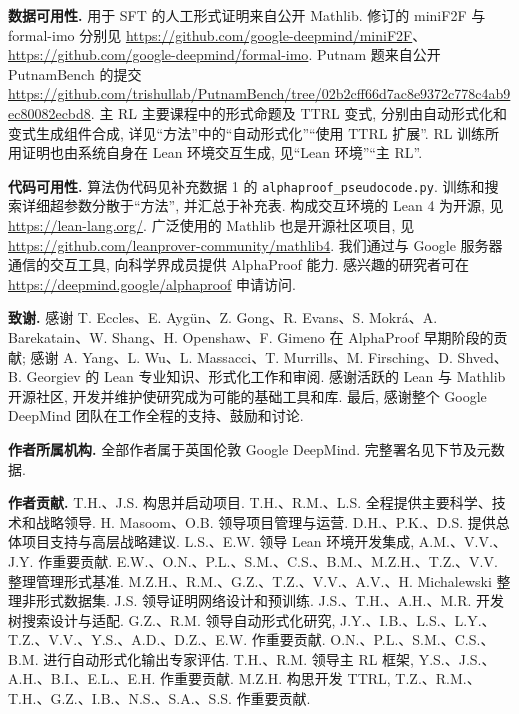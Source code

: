 \label{alphaproof-availability}
\noindent\textbf{数据可用性.} 用于 SFT 的人工形式证明来自公开 Mathlib\cite{alphaproof-ref4}. 修订的 miniF2F 与 formal-imo 分别见 \url{https://github.com/google-deepmind/miniF2F}、\url{https://github.com/google-deepmind/formal-imo}. Putnam 题来自公开 PutnamBench\cite{alphaproof-ref21} 的提交 \url{https://github.com/trishullab/PutnamBench/tree/02b2cff66d7ac8e9372c778c4ab9ec80082ecbd8}. 主 RL 主要课程中的形式命题及 TTRL 变式, 分别由自动形式化和变式生成组件合成, 详见“方法”中的“自动形式化”“使用 TTRL 扩展”. RL 训练所用证明也由系统自身在 Lean 环境交互生成, 见“Lean 环境”“主 RL”.

\noindent\textbf{代码可用性.} 算法伪代码见补充数据 1 的 \texttt{alphaproof\_pseudocode.py}. 训练和搜索详细超参数分散于“方法”, 并汇总于补充表. 构成交互环境的 Lean 4 为开源, 见 \url{https://lean-lang.org/}. 广泛使用的 Mathlib 也是开源社区项目, 见 \url{https://github.com/leanprover-community/mathlib4}. 我们通过与 Google 服务器通信的交互工具, 向科学界成员提供 AlphaProof 能力. 感兴趣的研究者可在 \url{https://deepmind.google/alphaproof} 申请访问.

\label{alphaproof-backmatter}
\noindent\textbf{致谢.} 感谢 T. Eccles、E. Aygün、Z. Gong、R. Evans、S. Mokrá、A. Barekatain、W. Shang、H. Openshaw、F. Gimeno 在 AlphaProof 早期阶段的贡献; 感谢 A. Yang、L. Wu、L. Massacci、T. Murrills、M. Firsching、D. Shved、B. Georgiev 的 Lean 专业知识、形式化工作和审阅. 感谢活跃的 Lean 与 Mathlib 开源社区, 开发并维护使研究成为可能的基础工具和库. 最后, 感谢整个 Google DeepMind 团队在工作全程的支持、鼓励和讨论.

\noindent\textbf{作者所属机构.} 全部作者属于英国伦敦 Google DeepMind. 完整署名见下节及元数据.

\noindent\textbf{作者贡献.} T.H.、J.S. 构思并启动项目. T.H.、R.M.、L.S. 全程提供主要科学、技术和战略领导. H. Masoom、O.B. 领导项目管理与运营. D.H.、P.K.、D.S. 提供总体项目支持与高层战略建议. L.S.、E.W. 领导 Lean 环境开发集成, A.M.、V.V.、J.Y. 作重要贡献. E.W.、O.N.、P.L.、S.M.、C.S.、B.M.、M.Z.H.、T.Z.、V.V. 整理管理形式基准. M.Z.H.、R.M.、G.Z.、T.Z.、V.V.、A.V.、H. Michalewski 整理非形式数据集. J.S. 领导证明网络设计和预训练. J.S.、T.H.、A.H.、M.R. 开发树搜索设计与适配. G.Z.、R.M. 领导自动形式化研究, J.Y.、I.B.、L.S.、L.Y.、T.Z.、V.V.、Y.S.、A.D.、D.Z.、E.W. 作重要贡献. O.N.、P.L.、S.M.、C.S.、B.M. 进行自动形式化输出专家评估. T.H.、R.M. 领导主 RL 框架, Y.S.、J.S.、A.H.、B.I.、E.L.、E.H. 作重要贡献. M.Z.H. 构思开发 TTRL, T.Z.、R.M.、T.H.、G.Z.、I.B.、N.S.、S.A.、S.S. 作重要贡献.

